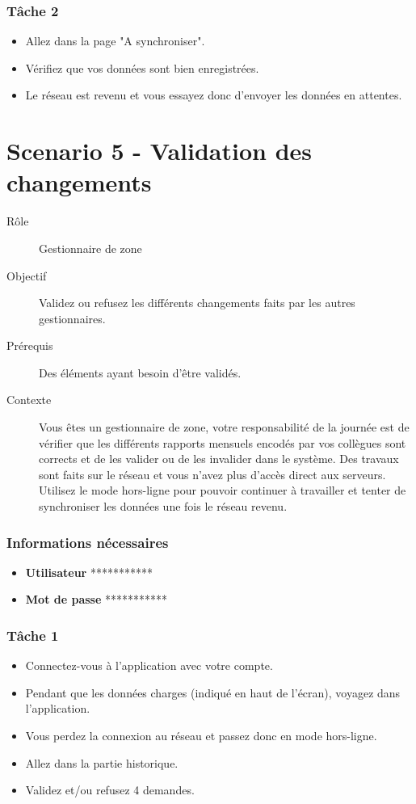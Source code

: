 \documentclass{EPL-master-thesis-covers-FR}
\begin{document}
				\subsubsection*{Tâche 2}
					\begin{itemize}
						\item Allez dans la page "A synchroniser". 
						\item Vérifiez que vos données sont bien enregistrées. 
						\item Le réseau est revenu et vous essayez donc d’envoyer les données en attentes. 
					\end{itemize}
	

\newpage
			\section*{Scenario 5 - Validation des changements}
				\begin{description}
					\item[Rôle] Gestionnaire de zone 
					\item[Objectif] Validez ou refusez les différents changements faits par les autres gestionnaires. 
					\item[Prérequis] Des éléments ayant besoin d’être validés. 
					\item[Contexte] Vous êtes un gestionnaire de zone, votre responsabilité de la journée est de vérifier que les différents rapports mensuels encodés par vos collègues sont corrects et de les valider ou de les invalider dans le système. Des travaux sont faits sur le réseau et vous n’avez plus d’accès direct aux serveurs. Utilisez le mode hors-ligne pour pouvoir continuer à travailler et tenter de synchroniser les données une fois le réseau revenu. 
				\end{description}
							
				\subsubsection*{Informations nécessaires}
					\begin{itemize}[noitemsep, label={}]
						\item \textbf{Utilisateur} ***********
						\item \textbf{Mot de passe} ***********
					\end{itemize}
					
				\subsubsection*{Tâche 1}
					\begin{itemize}
						\item Connectez-vous à l’application avec votre compte. 
						\item Pendant que les données charges (indiqué en haut de l’écran), voyagez dans l’application. 
						\item Vous perdez la connexion au réseau et passez donc en mode hors-ligne. 
						\item Allez dans la partie historique. 
						\item Validez et/ou refusez 4 demandes. 
					\end{itemize}
					
\end{document}
